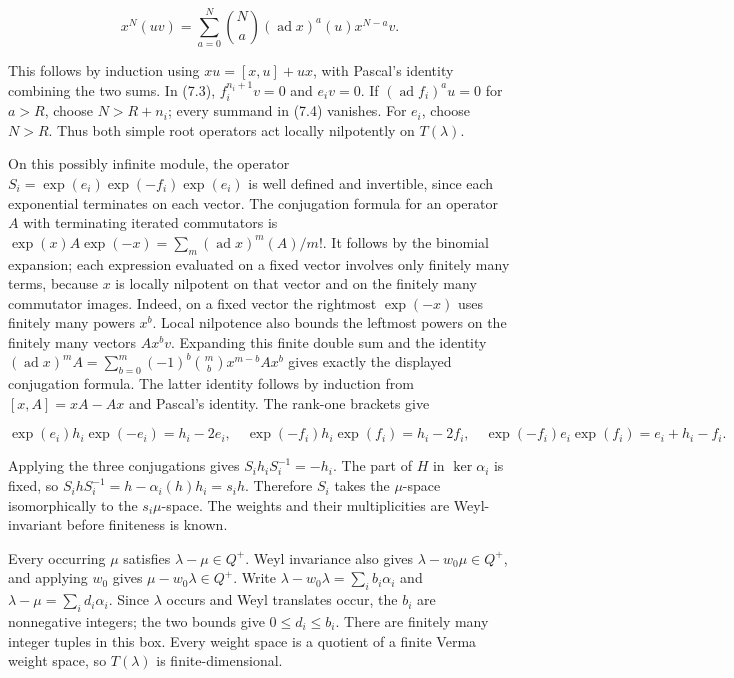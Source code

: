 \documentclass[11pt,a4paper,openany]{report}
\begin{document}
\[
x^N(uv)=\sum_{a=0}^N\binom Na(\operatorname{ad}x)^a(u)x^{N-a}v.
\tag{7.4}
\]

This follows by induction using \(xu=[x,u]+ux\), with Pascal's identity combining the two sums. In (7.3), \(f_i^{n_i+1}v=0\) and \(e_iv=0\). If \((\operatorname{ad}f_i)^a u=0\) for \(a>R\), choose \(N>R+n_i\); every summand in (7.4) vanishes. For \(e_i\), choose \(N>R\). Thus both simple root operators act locally nilpotently on \(T(\lambda)\).

On this possibly infinite module, the operator \(S_i=\exp(e_i)\exp(-f_i)\exp(e_i)\) is well defined and invertible, since each exponential terminates on each vector. The conjugation formula for an operator \(A\) with terminating iterated commutators is \(\exp(x)A\exp(-x)=\sum_m(\operatorname{ad}x)^m(A)/m!\). It follows by the binomial expansion; each expression evaluated on a fixed vector involves only finitely many terms, because \(x\) is locally nilpotent on that vector and on the finitely many commutator images. Indeed, on a fixed vector the rightmost \(\exp(-x)\) uses finitely many powers \(x^b\). Local nilpotence also bounds the leftmost powers on the finitely many vectors \(Ax^b v\). Expanding this finite double sum and the identity \((\operatorname{ad}x)^m A=\sum_{b=0}^m(-1)^b\binom mb x^{m-b}Ax^b\) gives exactly the displayed conjugation formula. The latter identity follows by induction from \([x,A]=xA-Ax\) and Pascal's identity. The rank-one brackets give

\[
\exp(e_i)h_i\exp(-e_i)=h_i-2e_i,\quad
\exp(-f_i)h_i\exp(f_i)=h_i-2f_i,\quad
\exp(-f_i)e_i\exp(f_i)=e_i+h_i-f_i.
\tag{7.5}
\]

Applying the three conjugations gives \(S_i h_iS_i^{-1}=-h_i\). The part of \(H\) in \(\ker\alpha_i\) is fixed, so \(S_i hS_i^{-1}=h-\alpha_i(h)h_i=s_i h\). Therefore \(S_i\) takes the \(\mu\)-space isomorphically to the \(s_i\mu\)-space. The weights and their multiplicities are Weyl-invariant before finiteness is known.

Every occurring \(\mu\) satisfies \(\lambda-\mu\in Q^+\). Weyl invariance also gives \(\lambda-w_0\mu\in Q^+\), and applying \(w_0\) gives \(\mu-w_0\lambda\in Q^+\). Write \(\lambda-w_0\lambda=\sum_i b_i\alpha_i\) and \(\lambda-\mu=\sum_i d_i\alpha_i\). Since \(\lambda\) occurs and Weyl translates occur, the \(b_i\) are nonnegative integers; the two bounds give \(0\le d_i\le b_i\). There are finitely many integer tuples in this box. Every weight space is a quotient of a finite Verma weight space, so \(T(\lambda)\) is finite-dimensional.
\end{document}
